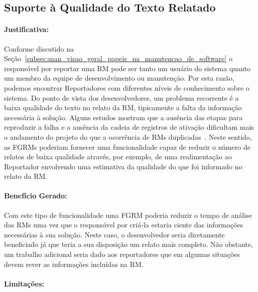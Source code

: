 \subsection{Suporte à Qualidade do Texto Relatado}\label{sub:supote_a_qualidade_do_relato}


\paragraph{Justificativa:}\label{par:justificativa_s01}

Conforme discutido na
Seção~\ref{subsec:man_visao_geral_papeis_na_manutencao_de_software} o
responsável por reportar uma RM pode ser tanto um usuário do sistema quanto um
membro da equipe de desenvolvimento ou manutenção. Por esta razão, podemos
encontrar Reportadores com diferentes níveis de conhecimento sobre o sistema.
Do ponto de vista dos desenvolvedores, um problema recorrente é a baixa
qualidade do texto no relato da RM, tipicamente a falta da informação necessária
à solução. Alguns estudos mostram que a ausência das etapas para reproduzir a
falha e a ausência da cadeia de registros de ativação dificultam mais o
andamento do projeto do que a ocorrência de RMs
duplicadas~\cite{zimmermann2010makes, bettenburg2007quality}. Neste sentido, as
FGRMs poderiam fornecer uma funcionalidade capaz de reduzir o número de relatos
de baixa qualidade através, por exemplo, de uma realimentação ao Reportador
envolvendo uma estimativa da qualidade do que foi informado no relato da RM\@.

\paragraph{Benefício Gerado:}\label{par:beneficio_s01}

Com este tipo de funcionalidade uma FGRM poderia reduzir o tempo de análise das
RMs uma vez que o responsável por criá-la estaria ciente das informações
necessárias à sua solução. Neste caso, o desenvolvedor seria diretamente
beneficiado já que teria a sua disposição um relato mais completo. Não
obstante, um trabalho adicional seria dado aos reportadores que em algumas
situações devem rever as informações incluídas na RM\@.

\paragraph{Limitações:}\label{par:limitacoes_s01}


